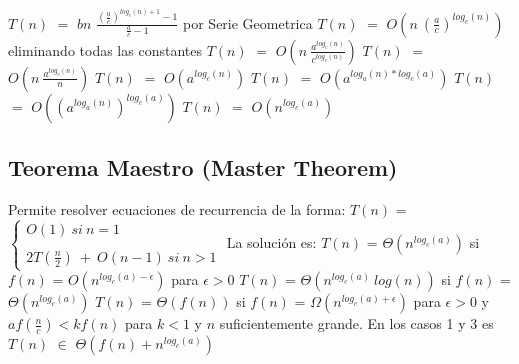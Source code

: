 \documentclass[10pt,a4paper]{article}
\begin{document}
\newline
$T(n)$ $=$ $bn$ $\displaystyle \frac{(\displaystyle \frac{a}{c})^{log_{c}(n)+1} - 1}{\displaystyle \frac{a}{c}-1}$ por Serie Geometrica 
\newline
\newline
\newline
$T(n)$ $=$ $O(n~(\displaystyle \frac{a}{c})^{log_{c}(n)})$ eliminando todas las constantes
\newline
\newline
\newline
$T(n)$ $=$ $O(n~\displaystyle \frac{a^{log_{c}(n)}}{c^{log_{c}(n)}})$
\newline
\newline
\newline
$T(n)$ $=$ $O(n~\displaystyle \frac{a^{log_{c}(n)}}{n})$
\newline
\newline
\newline
$T(n)$ $=$ $O(a^{log_{c}(n)})$
\newline
\newline
\newline
$T(n)$ $=$ $O(a^{log_{a}(n) * log_{c}(a)})$
\newline
\newline
\newline
$T(n)$ $=$ $O((a^{log_{a}(n)})^{log_{c}(a)})$
\newline
\newline
\newline
$T(n)$ $=$ $O(n^{log_{c}(a)})$

\subsection{Teorema Maestro (Master Theorem)}

Permite resolver ecuaciones de recurrencia de la forma:
\newline
\newline
\newline
$T(n)$ = $\left\lbrace\begin{array}{c} O(1)~si~n=1 \\ \\ 2T(\displaystyle \frac{n}{2})~+~O(n-1)~si~n>1 \end{array}\right.$
\newline
\newline
\newline
La solución es:
\newline
\newline
$T(n)$ = $\Theta(n^{log_{c}(a)})$ si $f(n)$ = $O(n^{log_{c}(a) - \epsilon})$ para $\epsilon > 0$
\newline
\newline
$T(n)$ = $\Theta(n^{log_{c}(a)}~log(n))$ si $f(n)$ = $\Theta(n^{log_{c}(a)})$ 
\newline
\newline
$T(n)$ = $\Theta(f(n))$ si $f(n)$ = $\Omega(n^{log_{c}(a) + \epsilon})$ para $\epsilon > 0$ y $af(\displaystyle \frac{n}{c}) < kf(n)$ para $k < 1$ y $n$ suficientemente grande.
\newline
\newline
En los casos 1 y 3 es $T(n)$ $\in$ $\Theta(f(n) + n^{log_{c}(a)})$
\end{document}
